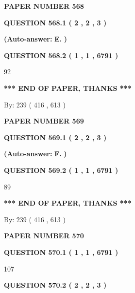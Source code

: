 \documentclass[12pt]{article}
\begin{document}
   
\newpage 
\setcounter{page}{ 
   568001 } 
   
   
 {\textbf{ \Large{ PAPER NUMBER  568  }}}
   
   
   
   
  
  
{\textbf{\large{QUESTION
568.1 
 ( 2 , 2 , 3 )
}}}
 
 
{\textbf{(Auto-answer:}}
{\textbf{\large{
E.}}}
{\textbf{)}}
 
 
  
  
{\textbf{\large{QUESTION
568.2 
 ( 1 , 1 , 6791 )
}}}

92
   
   
   
   
\vspace{1.0in} 
{\textbf{\large{ *** END OF PAPER, THANKS *** }}} 
   
   
\hspace{1.0in} By: 
 239 ( 416 ,  613 )
   
   
   
   
\newpage 
\setcounter{page}{ 
   569001 } 
   
   
 {\textbf{ \Large{ PAPER NUMBER  569  }}}
   
   
   
   
  
  
{\textbf{\large{QUESTION
569.1 
 ( 2 , 2 , 3 )
}}}
 
 
{\textbf{(Auto-answer:}}
{\textbf{\large{
F.}}}
{\textbf{)}}
 
 
  
  
{\textbf{\large{QUESTION
569.2 
 ( 1 , 1 , 6791 )
}}}

89
   
   
   
   
\vspace{1.0in} 
{\textbf{\large{ *** END OF PAPER, THANKS *** }}} 
   
   
\hspace{1.0in} By: 
 239 ( 416 ,  613 )
   
   
   
   
\newpage 
\setcounter{page}{ 
   570001 } 
   
   
 {\textbf{ \Large{ PAPER NUMBER  570  }}}
   
   
   
   
  
  
{\textbf{\large{QUESTION
570.1 
 ( 1 , 1 , 6791 )
}}}

107
  
  
{\textbf{\large{QUESTION
570.2 
 ( 2 , 2 , 3 )
}}}
 
\end{document}
